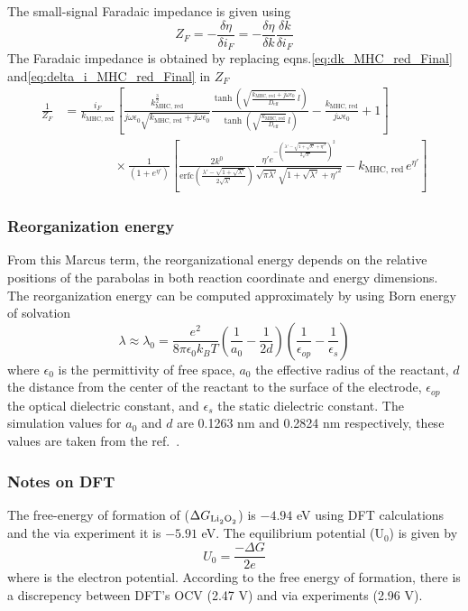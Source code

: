 \documentclass[12pt]{book}
\begin{document}
The small-signal Faradaic impedance is given using 
\begin{equation}
Z_{F}=-\frac{\delta\eta}{\delta i_{F}}=-\frac{\delta\eta}{\delta k}\frac{\delta k}{\delta i_{F}}
\end{equation}
The Faradaic impedance is obtained by replacing eqns.\ref{eq:dk_MHC_red_Final}
and\ref{eq:delta_i_MHC_red_Final} in $Z_{F}$
\begin{align}
\frac{1}{Z_{F}}&=\frac{i_{F}}{k_{\textrm{MHC, red}}}\left[\frac{k_{\textrm{MHC, red}}^{\frac{3}{2}}}{j\omega\epsilon_{0}\sqrt{k_{\textrm{MHC, red}}+j\omega\epsilon_{0}}}\frac{\tanh\left(\sqrt{\frac{k_{\textrm{MHC, red}}+j\omega\epsilon_{0}}{D_{\text{eff}}}}\,l\right)}{\tanh\left(\sqrt{\frac{k_{\textrm{MHC, red}}}{D_{\text{eff}}}}\,l\right)}-\frac{k_{\textrm{MHC, red}}}{j\omega\epsilon_{0}}+1\right]\nonumber\\&\qquad\qquad\times\frac{1}{\left(1+e^{\eta'}\right)}\left[\frac{2k^{0}}{\textrm{erfc}\left(\frac{\lambda'-\sqrt{1+\sqrt{\lambda'}}}{2\sqrt{\lambda'}}\right)}\frac{\eta'e^{-\left(\frac{\lambda'-\sqrt{1+\sqrt{\lambda'}+\eta'^{2}}}{2\sqrt{\lambda'}}\right)^{2}}}{\sqrt{\pi\lambda'}\sqrt{1+\sqrt{\lambda'}+\eta'^{2}}}-k_{\textrm{MHC, red}\,}e^{\eta'}\right]
\end{align}

\subsubsection{Reorganization energy}
From this Marcus term, the reorganizational energy depends on the relative positions of the parabolas in both reaction coordinate and energy dimensions. The reorganization energy can be computed approximately by using Born energy of solvation
\begin{equation}
\lambda \approx \lambda_0 = \frac{e^{2}}{8\pi\epsilon_{0}k_{B}T}\left(\frac{1}{a_{0}}-\frac{1}{2d}\right)\left(\frac{1}{\epsilon_{op}}-\frac{1}{\epsilon_{s}}\right)
\end{equation}
where $\epsilon_{0}$ is the permittivity of free space, $a_{0}$ the effective radius of the reactant, $d$ the distance from the center of the reactant to the surface of the electrode, $\epsilon_{op}$ the optical dielectric constant, and $\epsilon_{s}$ the static dielectric constant. 
The simulation values for $a_0$ and $d$ are 0.1263 nm and 0.2824 nm respectively, these values are taken from the ref.~\cite{Yan2012}. 
\subsubsection{Notes on DFT}
The free-energy of formation of ($\Delta G_\textrm{\ce{Li2O2}}$) is $-4.94$ eV using DFT calculations and the via experiment it is $-5.91$ eV. The equilibrium potential (U$_0$) is given by
\begin{equation}
U_0 = \frac{-\Delta G}{2e}
\end{equation}
 where is the electron potential. According to the free energy of formation, there is a discrepency between DFT's OCV (2.47 V) and via experiments (2.96 V). 
\end{document}
